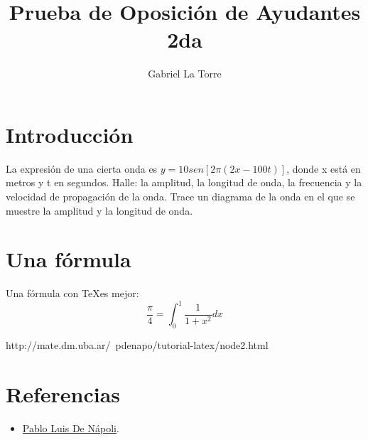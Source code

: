 \documentclass[spanish] {article}
\begin{document}
\title{Prueba de Oposición de Ayudantes 2da}
\author{Gabriel La Torre}

\maketitle
\newpage
\section{Introducción}
La expresión de una cierta onda es $y = 10 sen [2 \pi (2x- 100 t)]$, donde x está en metros y t en 
segundos. Halle: la amplitud, la longitud de onda, la frecuencia y la velocidad de propagación de la 
onda. Trace un diagrama de la onda en el que se muestre la amplitud y la longitud de onda. 
\section{Una fórmula}
Una fórmula con \TeX es mejor:
$$ \frac{\pi}{4} = \int_0^1 \frac{1}{1+x^2} dx $$


http://mate.dm.uba.ar/~pdenapo/tutorial-latex/node2.html
\newpage
\section{Referencias}

\begin{itemize}
  \item \href{http://mate.dm.uba.ar/~pdenapo/tutorial-latex/node2.html}{Pablo Luis De Nápoli}.
\end{itemize}
\end{document}
